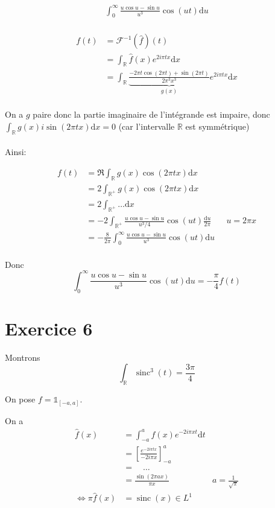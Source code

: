 \documentclass{article}
\renewcommand{\d}{\mathrm{d}}
\newcommand{\cF}{\mathcal{F}}
\newcommand{\R}{\mathbb{R}}
\newcommand{\sinc}{\operatorname{sinc}}
\begin{document}
 \begin{align*}
 	\int_0^{\infty} \frac{u \cos u - \sin u}{u^3} \cos(ut) \d u \\
 \end{align*}

\begin{align*}
	f(t) &= \cF^{-1}(\widehat{f})(t) \\
	&= \int_\R \widehat{f}(x) e^{2i\pi t x} \d x \\
	&= \int_\R \underbrace{\frac{-2 \pi t \cos(2 \pi t) + \sin(2 \pi t)}{2 \pi^3 x^3}}_{g(x)} e^{2i \pi t x} \d x \\
\end{align*}

On a $g$ paire donc la partie imaginaire de l'intégrande est impaire, donc $\int_{\R} g(x) i\sin(2 \pi t x) \d x = 0$ (car l'intervalle $\R$ est symmétrique)
\paragraph{}

Ainsi:

\begin{align*}
	f(t) &= \Re \int_\R g(x) \cos(2 \pi t x) \d x \\
	&= 2 \int_{\R^{+}} g(x) \cos(2 \pi t x) \d x \\
	&= 2 \int_{\R^{+}} \ldots \d x \\
	&= -2 \int_{\R^{+}} \frac{u \cos u - \sin u}{u^3 / 4} \cos(ut) \frac{\d u}{2 \pi  } \quad&u = 2 \pi x \\
	&= -\frac{8}{2\pi} \int_0^{\infty} \frac{u \cos u - \sin u}{u ^3} \cos(ut) \d u \\
\end{align*}

Donc 
\[
	\int_0^{\infty} \frac{u \cos u - \sin u}{u^3} \cos(ut) \d u = -\frac{\pi}{4} f(t)
\] 


\section{Exercice 6}

Montrons
\[
	\int_\R \sinc ^3(t) = \frac{3\pi}{4}
\] 

On pose $f = \mathbb{1}_{[-a, a]}$.

On a 
\begin{align*}
	\widehat{f}(x) &= \int_{-a}^{a} f(x) e^{-2i \pi x t} \d t \\
		   &= \left[ \frac{e^{-2i \pi t x}}{- 2 i \pi x} \right]_{-a}^a \\
		   &= \quad \ldots \\
		   &= \frac{\sin(2 \pi a x)}{\pi x} \quad&a = \frac{1}{\sqrt{\pi} } \\
		\iff \pi \widehat{f}(x) &= \sinc(x) \in L^1 \\
\end{align*}
\end{document}
